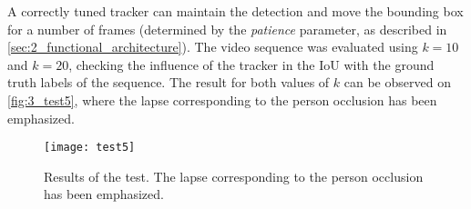 A correctly tuned tracker can maintain the detection and move the bounding box for a number of frames (determined by the \textit{patience} parameter, as described in \autoref{sec:2_functional_architecture}). The video sequence was evaluated using $k=10$ and $k=20$, checking the influence of the tracker in the IoU with the ground truth labels of the sequence. The result for both values of $k$ can be observed on \autoref{fig:3_test5}, where the lapse corresponding to the person occlusion has been emphasized.

\begin{figure}[h]
	\centering
	\texttt{[image: test5]}
	\caption{Results of the test. The lapse corresponding to the person occlusion has been emphasized.}
	\label{fig:3_test5}
\end{figure}
